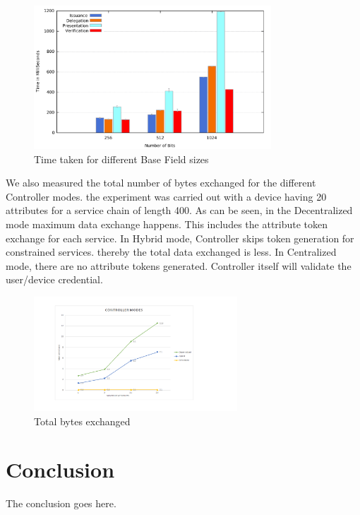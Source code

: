 \documentclass[journal]{IEEEtran}
\begin{document}
\begin{figure}[htbp]
\centerline{\includegraphics[width=3.5in]{security.pdf}}
\caption{Time taken for different Base Field sizes}
\label{fig:security}
\end{figure}

We also measured the total number of bytes exchanged for the different Controller modes. the experiment was carried out with a device having 20 attributes for a service chain of length 400. As can be seen, in the Decentralized mode maximum data exchange happens. This includes the attribute token exchange for each service. In Hybrid mode, Controller skips token generation for constrained services. thereby the total data exchanged is less. In Centralized mode, there are no attribute tokens generated. Controller itself will validate the user/device credential.

\begin{figure}[htbp]
\centerline{\includegraphics[width=3in]{controller_modes_home.png}}
\caption{Total bytes exchanged}
\label{fig:bytes}
\end{figure}



\section{Conclusion}
The conclusion goes here.



\end{document}
